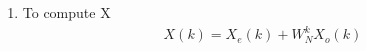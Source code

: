 \documentclass[journal,12pt,twocolumn]{IEEEtran}
\renewcommand\thesection{\arabic{section}}
\begin{document}
\begin{enumerate}[label=\thesection.\arabic*.,ref=\thesection.\theenumi]

\item To compute X
\begin{align}
   X(k) = X_{e}(k) + W^{k}_{N}X_{o}(k)
\end{align}

\end{enumerate}
\end{document}
